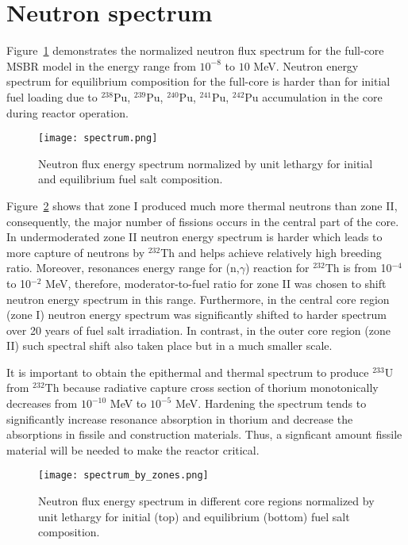 \section{Neutron spectrum}
Figure~\ref{fig:spectrum} demonstrates the normalized neutron flux spectrum for the full-core \gls{MSBR} model in the energy range from $10^{-8}$ to $10$ MeV. Neutron energy spectrum for equilibrium composition for the full-core is harder than for initial fuel loading due to $^{238}$Pu, $^{239}$Pu, $^{240}$Pu, $^{241}$Pu, $^{242}$Pu accumulation in the core during reactor operation. 

\begin{figure}[htp!] %
  \centering
    \vspace{-0.3em}
  \texttt{[image: spectrum.png]} 
  \caption{Neutron flux energy spectrum normalized by unit lethargy for initial and equilibrium fuel salt composition.}
    \vspace{-0.6em}
  \label{fig:spectrum}
\end{figure}
\FloatBarrier

Figure~\ref{fig:spectrum_zones} shows that zone I produced much more thermal neutrons than zone II, consequently, the major number of fissions occurs in the central part of the core. In undermoderated zone II neutron energy spectrum is harder which leads to more capture of neutrons by $^{232}$Th and helps achieve relatively high breeding ratio. Moreover, resonances energy range for (n,$\gamma$) reaction for $^{232}$Th is from 10$^{-4}$ to 10$^{-2}$ MeV, therefore, moderator-to-fuel ratio for zone II was chosen to shift neutron energy spectrum in this range. Furthermore, in the central core region (zone I) neutron energy spectrum was significantly shifted to harder spectrum over 20 years of fuel salt irradiation. In contrast, in the outer core region (zone II) such spectral shift also taken place but in a much smaller scale. 

It is important to obtain the epithermal and thermal spectrum to produce $^{233}$U from $^{232}$Th because radiative capture cross section of thorium monotonically decreases from $10^{-10}$ MeV to $10^{-5}$ MeV. Hardening the spectrum tends to significantly increase resonance absorption in thorium and decrease the absorptions in fissile and construction materials. Thus, a signficant amount fissile material will be needed to make the reactor critical. 

\begin{figure}[htp!] %
  \centering
    \vspace{-0.3em}
  \texttt{[image: spectrum\_by\_zones.png]} 
  \caption{Neutron flux energy spectrum in different core regions normalized by unit lethargy for initial (top) and equilibrium (bottom) fuel salt composition.}
    \vspace{-0.6em}
  \label{fig:spectrum_zones}
\end{figure}
\FloatBarrier

